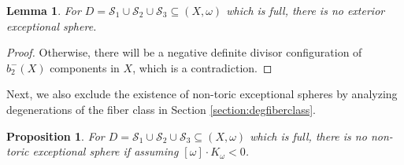 \documentclass[11pt]{article}
\newtheorem{proposition}[theorem]{Proposition}
\newtheorem{lemma}[theorem]{Lemma}
\theoremstyle{definition}
\theoremstyle{remark}
\newcommand{\st}{\mathcal{S}}
\begin{document}
\begin{lemma}\label{lem:noexterior}
For $D=\st_1\cup\st_2\cup\st_3\subseteq (X,\omega)$ which is full, there is no exterior exceptional sphere.
\end{lemma}

\begin{proof}
  Otherwise, there will be a negative definite divisor configuration of $b_2^-(X)$ components in $X$, which is a contradiction.
\end{proof}

Next, we also exclude the existence of non-toric exceptional spheres by analyzing degenerations of the fiber class in Section \ref{section:degfiberclass}.

\begin{proposition}\label{prop:nonontoric}
 For $D=\st_1\cup\st_2\cup\st_3\subseteq (X,\omega)$ which is full, there is no non-toric exceptional sphere if assuming $[\omega]\cdot K_{\omega}<0$.
\end{proposition}
  
\end{document}
